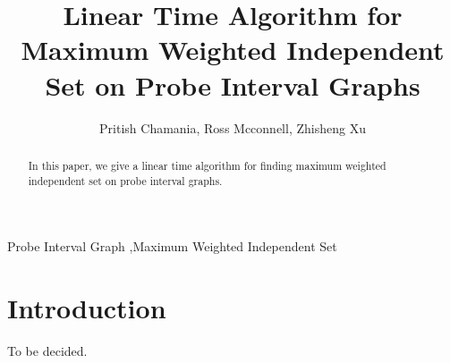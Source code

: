 \documentclass[preprint,12pt,authoryear]{elsarticle}
\begin{document}


\title{Linear Time Algorithm for Maximum Weighted Independent Set on Probe Interval Graphs}


\begin{frontmatter}

\author{Pritish Chamania, Ross Mcconnell, Zhisheng Xu}

\address{}

\begin{abstract}
In this paper, we give a linear time algorithm for finding maximum weighted independent set on probe interval graphs.

\end{abstract}

\begin{keyword}


Probe Interval Graph \sep Maximum Weighted Independent Set
\end{keyword}

\end{frontmatter}



\section{Introduction}
To be decided.
\end{document}
